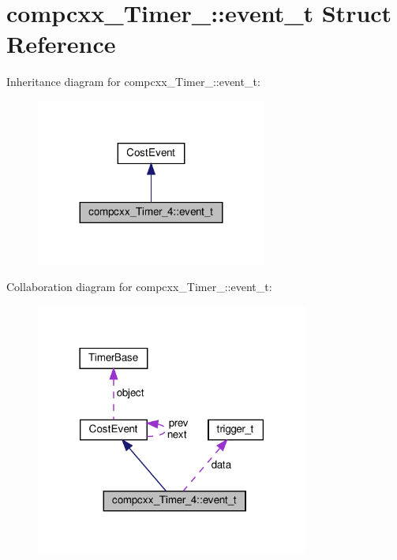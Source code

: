 \hypertarget{structcompcxx__Timer__4_1_1event__t}{}\section{compcxx\+\_\+\+Timer\+\_\+:\+:event\+\_\+t Struct Reference}
\label{structcompcxx__Timer__4_1_1event__t}


Inheritance diagram for compcxx\+\_\+\+Timer\+\_\+:\+:event\+\_\+t\+:\nopagebreak
\begin{figure}[H]
\begin{center}
\leavevmode
\includegraphics[width=215pt]{structcompcxx__Timer__4_1_1event__t__inherit__graph}
\end{center}
\end{figure}


Collaboration diagram for compcxx\+\_\+\+Timer\+\_\+:\+:event\+\_\+t\+:\nopagebreak
\begin{figure}[H]
\begin{center}
\leavevmode
\includegraphics[width=254pt]{structcompcxx__Timer__4_1_1event__t__coll__graph}
\end{center}
\end{figure}
